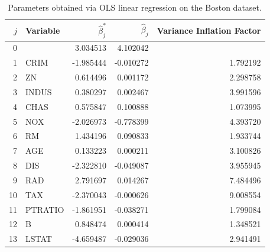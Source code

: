 \documentclass[10pt]{article}
\begin{document}
    \begin{table}[H]
    \centering
    \begin{tabular}{|r|l|r|r|r|} \hline
        $j$ & Variable    & $\hat{\beta}_j^*$
                                        & $\hat{\beta}_j$
                                                        &    Variance Inflation Factor
                                                                      \\\hline
        0   &             & 3.034513    &      4.102042 &             \\
        1   & CRIM        &-1.985444    &     -0.010272 &    1.792192 \\
        2   & ZN          & 0.614496    &      0.001172 &    2.298758 \\
        3   & INDUS       & 0.380297    &      0.002467 &    3.991596 \\
        4   & CHAS        & 0.575847    &      0.100888 &    1.073995 \\
        5   & NOX         &-2.026973    &     -0.778399 &    4.393720 \\
        6   & RM          & 1.434196    &      0.090833 &    1.933744 \\
        7   & AGE         & 0.133223    &      0.000211 &    3.100826 \\
        8   & DIS         &-2.322810    &     -0.049087 &    3.955945 \\
        9   & RAD         & 2.791697    &      0.014267 &    7.484496 \\
        10  & TAX         &-2.370043    &     -0.000626 &    9.008554 \\
        11  & PTRATIO     &-1.861951    &     -0.038271 &    1.799084 \\
        12  & B           & 0.848474    &      0.000414 &    1.348521 \\
        13  & LSTAT       &-4.659487    &     -0.029036 &    2.941491 \\\hline
    \end{tabular}
    \vspace{1em}
    \caption{Parameters obtained via OLS linear regression on the Boston dataset.}
    \label{tab:ols_parameters}
    \end{table}
\end{document}
